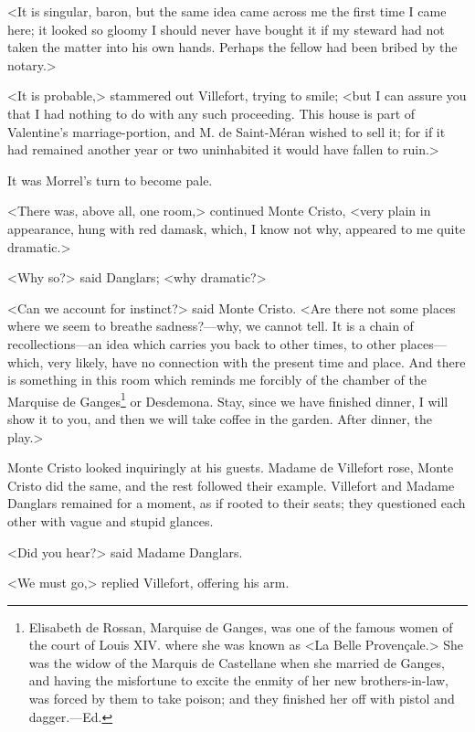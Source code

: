  <It is singular, baron, but the same idea came across me the first time I came here; it looked so gloomy I should never have bought it if my steward had not taken the matter into his own hands. Perhaps the fellow had been bribed by the notary.> 

 <It is probable,> stammered out Villefort, trying to smile; <but I can assure you that I had nothing to do with any such proceeding. This house is part of Valentine's marriage-portion, and M. de Saint-Méran wished to sell it; for if it had remained another year or two uninhabited it would have fallen to ruin.> 

 It was Morrel's turn to become pale. 

 <There was, above all, one room,> continued Monte Cristo, <very plain in appearance, hung with red damask, which, I know not why, appeared to me quite dramatic.> 

 <Why so?> said Danglars; <why dramatic?> 

 <Can we account for instinct?> said Monte Cristo. <Are there not some places where we seem to breathe sadness?—why, we cannot tell. It is a chain of recollections—an idea which carries you back to other times, to other places—which, very likely, have no connection with the present time and place. And there is something in this room which reminds me forcibly of the chamber of the Marquise de Ganges\footnote{Elisabeth de Rossan, Marquise de Ganges, was one of the famous women of the court of Louis XIV. where she was known as <La Belle Provençale.> She was the widow of the Marquis de Castellane when she married de Ganges, and having the misfortune to excite the enmity of her new brothers-in-law, was forced by them to take poison; and they finished her off with pistol and dagger.—Ed.} or Desdemona. Stay, since we have finished dinner, I will show it to you, and then we will take coffee in the garden. After dinner, the play.> 

 Monte Cristo looked inquiringly at his guests. Madame de Villefort rose, Monte Cristo did the same, and the rest followed their example. Villefort and Madame Danglars remained for a moment, as if rooted to their seats; they questioned each other with vague and stupid glances. 

 <Did you hear?> said Madame Danglars. 

 <We must go,> replied Villefort, offering his arm. 

